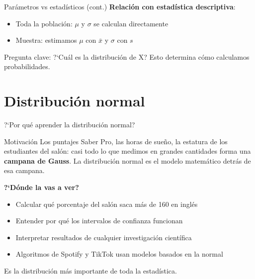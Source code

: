 \documentclass[aspectratio=169, 11pt]{beamer}
\begin{document}
\begin{frame}{Par\'ametros vs estad\'isticos (cont.)}
\textbf{Relaci\'on con estad\'istica descriptiva}:
\begin{itemize}
\item \alert{Toda la poblaci\'on}: $\mu$ y $\sigma$ se calculan directamente
\item \alert{Muestra}: estimamos $\mu$ con $\bar{x}$ y $\sigma$ con $s$
\end{itemize}

\alert{Pregunta clave}: ?`Cu\'al es la distribuci\'on de X? Esto determina c\'omo calculamos probabilidades.
\end{frame}


\section{Distribución normal}

\begin{frame}{?`Por qu\'e aprender la distribuci\'on normal?}
\begin{exampleblock}{Motivaci\'on}
Los puntajes Saber Pro, las horas de sue\~no, la estatura de los estudiantes del sal\'on: casi todo lo que medimos en grandes cantidades forma una \textbf{campana de Gauss}. La distribuci\'on normal es el modelo matem\'atico detr\'as de esa campana.
\end{exampleblock}

\textbf{?`D\'onde la vas a ver?}
\begin{itemize}\setlength{\itemsep}{1pt}
  \item Calcular qu\'e porcentaje del sal\'on saca m\'as de 160 en ingl\'es
  \item Entender por qu\'e los intervalos de confianza funcionan
  \item Interpretar resultados de cualquier investigaci\'on cient\'ifica
  \item Algoritmos de Spotify y TikTok usan modelos basados en la normal
\end{itemize}

\alert{Es la distribuci\'on m\'as importante de toda la estad\'istica.}
\end{frame}
\end{document}
